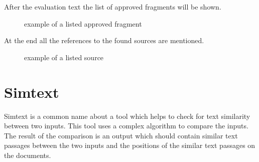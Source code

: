 After the evaluation text the list of approved fragments will be shown.

\begin{figure}[!h]
  \centering
  \caption{example of a listed approved fragment}
  \label{fig:report_fragment}
\end{figure}

\pagebreak
At the end all the references to the found sources are mentioned.

\begin{figure}[!h]
  \centering
  \caption{example of a listed source}
  \label{fig:report_according_sources}
\end{figure}

\pagebreak

\section{Simtext}
Simtext is a common name about a tool which helps to check for text similarity between two inputs. This tool uses a complex algorithm to compare the inputs. The result of the comparison is an output which should contain similar text passages between the two inputs and the positions of the similar text passages on the documents. 

